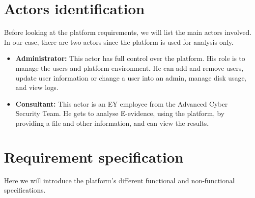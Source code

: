 \section{Actors identification}
Before looking at the platform requirements, we will list the main actors involved. In our case, there are two actors since the platform is used for analysis only.
\begin{itemize}
    \item \textbf{Administrator:}
    This actor has full control over the platform. His role is to manage the users and platform environment. He can add and remove users, update user information or change a user into an admin, manage disk usage, and view logs.
    \item \textbf{Consultant:}
    This actor is an EY employee from the Advanced Cyber Security Team. He gets to analyse E-evidence, using the platform, by providing a file and other information, and can view the results.
\end{itemize}

\section{Requirement specification}
Here we will introduce the platform's different functional and non-functional specifications.
